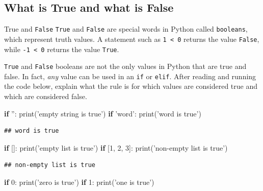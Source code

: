 \documentclass[]{book}
\newenvironment{Shaded}{\begin{snugshade}}{\end{snugshade}}
\newcommand{\BuiltInTok}[1]{#1}
\newcommand{\ControlFlowTok}[1]{\textcolor[rgb]{0.13,0.29,0.53}{\textbf{#1}}}
\newcommand{\DecValTok}[1]{\textcolor[rgb]{0.00,0.00,0.81}{#1}}
\newcommand{\NormalTok}[1]{#1}
\newcommand{\StringTok}[1]{\textcolor[rgb]{0.31,0.60,0.02}{#1}}
\theoremstyle{definition}
\theoremstyle{definition}
\theoremstyle{definition}
\theoremstyle{remark}
\begin{document}
\hypertarget{what-is-true-and-what-is-false}{%
\subsection{What is True and what is
False}\label{what-is-true-and-what-is-false}}

True and \texttt{False} \texttt{True} and \texttt{False} are special
words in Python called \texttt{booleans}, which represent truth values.
A statement such as \texttt{1\ \textless{}\ 0} returns the value
\texttt{False}, while \texttt{-1\ \textless{}\ 0} returns the value
\texttt{True}.

\texttt{True} and \texttt{False} booleans are not the only values in
Python that are true and false. In fact, \emph{any} value can be used in
an \texttt{if} or \texttt{elif}. After reading and running the code
below, explain what the rule is for which values are considered true and
which are considered false.

\begin{Shaded}
\begin{Highlighting}[]
\ControlFlowTok{if} \StringTok{''}\NormalTok{:}
    \BuiltInTok{print}\NormalTok{(}\StringTok{'empty string is true'}\NormalTok{)}
\ControlFlowTok{if} \StringTok{'word'}\NormalTok{:}
    \BuiltInTok{print}\NormalTok{(}\StringTok{'word is true'}\NormalTok{)}
\end{Highlighting}
\end{Shaded}

\begin{verbatim}
## word is true
\end{verbatim}

\begin{Shaded}
\begin{Highlighting}[]
\ControlFlowTok{if}\NormalTok{ []:}
    \BuiltInTok{print}\NormalTok{(}\StringTok{'empty list is true'}\NormalTok{)}
\ControlFlowTok{if}\NormalTok{ [}\DecValTok{1}\NormalTok{, }\DecValTok{2}\NormalTok{, }\DecValTok{3}\NormalTok{]:}
    \BuiltInTok{print}\NormalTok{(}\StringTok{'non-empty list is true'}\NormalTok{)}
\end{Highlighting}
\end{Shaded}

\begin{verbatim}
## non-empty list is true
\end{verbatim}

\begin{Shaded}
\begin{Highlighting}[]
\ControlFlowTok{if} \DecValTok{0}\NormalTok{:}
     \BuiltInTok{print}\NormalTok{(}\StringTok{'zero is true'}\NormalTok{)}
\ControlFlowTok{if} \DecValTok{1}\NormalTok{:}
    \BuiltInTok{print}\NormalTok{(}\StringTok{'one is true'}\NormalTok{)}
\end{Highlighting}
\end{Shaded}
\end{document}
